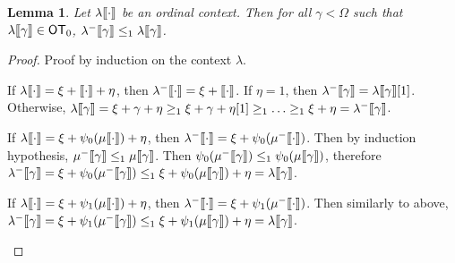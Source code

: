 \documentclass{amsart}
\theoremstyle{plain}
\theoremstyle{plain}
\newtheorem{lemma}[theorem]{Lemma}
\def\scbrl{[\hspace{-.14em}[}
\def\scbrr{]\hspace{-.14em}]}
\def\scbr#1{\scbrl#1\scbrr}
\newcommand\OT{\mathsf{OT}}
\newcommand{\Om}{{\Omega}}
\newcommand{\ga}{\gamma}
\newcommand{\la}{\lambda}
\def\scbrl{[\hspace{-.14em}[}
\def\scbrr{]\hspace{-.14em}]}
\def\scbr#1{\scbrl#1\scbrr}
\begin{document}
\begin{lemma} \label{lm:lala-}
Let $\la\scbr{\cdot}$ be an ordinal context. %
Then for all $\ga<\Om$ such that $\la\scbr{\ga} \in \OT_0$,  $\la^-\scbr{\ga} \leq_{1} \la\scbr{\ga}$.
\end{lemma}
\begin{proof}
Proof by induction on the context $\la$.
\begin{Cases}

\item If $\la\scbr{\cdot} = \xi + \scbr{\cdot} + \eta$, then $\la^-\scbr{\cdot} = \xi +\scbr{\cdot}$. 
If $\eta=1$, then $\la^-\scbr{\ga}=\la\scbr{\ga}[1]$.\\
Otherwise, $\la\scbr{\ga} = \xi+\ga+\eta \geq_1 \xi+\ga+\eta[1] \geq_1\ldots \geq_1 \xi+\eta =\la^-\scbr{\ga}$.


\item If $\la\scbr{\cdot} = \xi + \psi_0(\mu\scbr{\cdot}) + \eta$, then $\la^-\scbr{\cdot} = \xi + \psi_0(\mu^-\scbr{\cdot})$. 
Then by induction hypothesis, $\mu^-\scbr{\ga} \leq_1 \mu\scbr{\ga}$. Then $\psi_0(\mu^-\scbr{\ga}) \leq_1 \psi_0( \mu\scbr{\ga})$,
therefore 
$\la^-\scbr{\ga} = \xi + \psi_0(\mu^-\scbr{\ga}) \leq_1 \xi + \psi_0(\mu\scbr{\ga}) + \eta =\la\scbr{\ga}$.

\item If $\la\scbr{\cdot} = \xi + \psi_1(\mu\scbr{\cdot}) + \eta$, then $\la^-\scbr{\cdot} = \xi + \psi_1(\mu^-\scbr{\cdot})$. 
Then similarly to above,
$\la^-\scbr{\ga} = \xi + \psi_1(\mu^-\scbr{\ga}) \leq_1 \xi + \psi_1(\mu\scbr{\ga}) + \eta =\la\scbr{\ga}$.
\end{Cases}
\end{proof}
\end{document}
